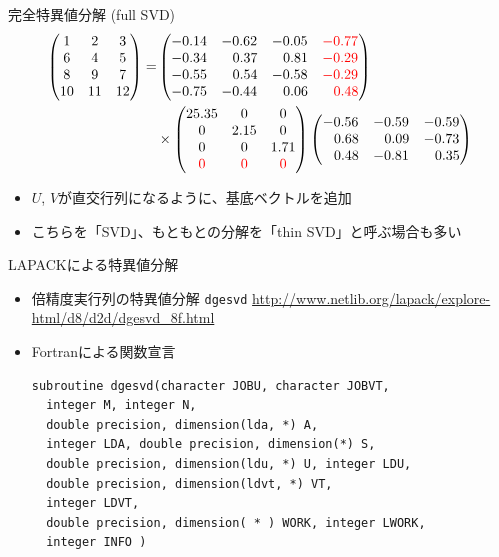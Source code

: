 \begin{frame}[t,fragile]{完全特異値分解 (full SVD)}
  \[
  \begin{split}
    \begin{pmatrix}
      1 & 2 & 3 \\
      6 & 4 & 5 \\
      8 & 9 & 7 \\
      10 & 11 & 12
    \end{pmatrix} =&
    \begin{pmatrix}
      -0.14 & -0.62 & -0.05 & {\color{red} -0.77} \\
      -0.34 & \ \ \,0.37 & \ \ \,0.81 & {\color{red} -0.29} \\
      -0.55 & \ \ \,0.54 & -0.58 & {\color{red} -0.29} \\
      -0.75 & -0.44 & \ \ \,0.06 & {\color{red} \ \ \,0.48}
    \end{pmatrix} \\
    &\times
    \begin{pmatrix}
      25.35 & 0 & 0 \\
      0 & 2.15 & 0 \\
      0 & 0 & 1.71 \\
      {\color{red} 0} & {\color{red} 0} & {\color{red} 0}
    \end{pmatrix}
    \begin{pmatrix}
      -0.56 & -0.59 & -0.59 \\
      \ \ \,0.68 & \ \ \,0.09 & -0.73 \\
      \ \ \,0.48 & -0.81 & \ \ \,0.35
    \end{pmatrix}
  \end{split}
  \]
  \begin{itemize}
  \item $U$, $V$が直交行列になるように、基底ベクトルを追加
  \item こちらを「SVD」、もともとの分解を「thin SVD」と呼ぶ場合も多い
  \end{itemize}
\end{frame}

\begin{frame}[t,fragile]{LAPACKによる特異値分解}
  \begin{itemize}
    \setlength{\itemsep}{1em}
  \item 倍精度実行列の特異値分解 {\tt dgesvd}
    \url{http://www.netlib.org/lapack/explore-html/d8/d2d/dgesvd_8f.html}
  \item Fortranによる関数宣言
\begin{lstlisting}
subroutine dgesvd(character JOBU, character JOBVT,
  integer M, integer N,
  double precision, dimension(lda, *) A,
  integer LDA, double precision, dimension(*) S,
  double precision, dimension(ldu, *) U, integer LDU,
  double precision, dimension(ldvt, *) VT,
  integer LDVT,
  double precision, dimension( * ) WORK, integer LWORK,
  integer INFO )
\end{lstlisting}
  \end{itemize}
\end{frame}

